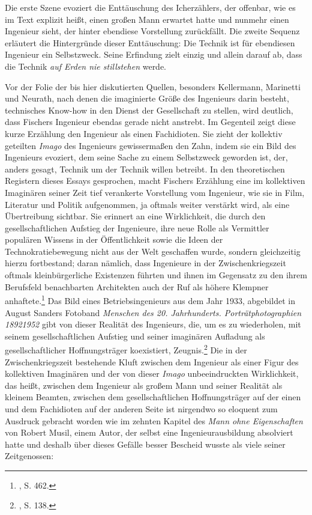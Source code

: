 \documentclass[%
	fontsize=10pt,%
	twoside,%
	headings=optiontoheadandtoc,%
	showtrims]{scrbook}
\renewenvironment{quote}{%
  \addmargin[\genericindent]{0pt}%
  \KOMAoptions{parskip=true}%
  \ifdim\parskip>0pt\else\addvspace{\intextsep}\fi
}{%
  \par
  \endaddmargin\vspace{\intextsep}
}
\begin{document}
\par Die erste Szene evoziert die Enttäuschung des Icherzählers, der offenbar, wie es im Text explizit heißt, einen großen Mann erwartet hatte und nunmehr einen Ingenieur sieht, der hinter ebendiese Vorstellung zurückfällt. Die zweite Sequenz erläutert die Hintergründe dieser Enttäuschung: Die Technik ist für ebendiesen Ingenieur ein Selbstzweck. Seine Erfindung zielt einzig und allein darauf ab, dass die Technik \emph{auf Erden nie stillstehen} werde.\par Vor der Folie der bis hier diskutierten Quellen, besonders Kellermann, Marinetti und Neurath, nach denen die imaginierte Größe des Ingenieurs darin besteht, technisches Know-how in den Dienst der Gesellschaft zu stellen, wird deutlich, dass Fischers Ingenieur ebendas gerade nicht anstrebt. Im Gegenteil zeigt diese kurze Erzählung den Ingenieur als einen Fachidioten. Sie zieht der kollektiv geteilten \emph{Imago} des Ingenieurs gewissermaßen den Zahn, indem sie ein Bild des Ingenieurs evoziert, dem seine Sache zu einem Selbstzweck geworden ist, der, anders gesagt, Technik um der Technik willen betreibt. In den theoretischen Registern dieses Essays gesprochen, macht Fischers Erzählung eine im kollektiven Imaginären seiner Zeit tief verankerte Vorstellung vom Ingenieur, wie sie in Film, Literatur und Politik aufgenommen, ja oftmals weiter verstärkt wird, als eine Übertreibung sichtbar. Sie erinnert an eine Wirklichkeit, die durch den gesellschaftlichen Aufstieg der Ingenieure, ihre neue Rolle als Vermittler populären Wissens in der Öffentlichkeit sowie die Ideen der Technokratiebewegung nicht aus der Welt geschaffen wurde, sondern gleichzeitig hierzu fortbestand; daran nämlich, dass Ingenieure in der Zwischenkriegszeit oftmals kleinbürgerliche Existenzen führten und ihnen im Gegensatz zu den ihrem Berufsfeld benachbarten Architekten auch der Ruf als höhere Klempner anhaftete.\footnote{\cite[][]{treue1967a}, S. 462.}  Das Bild eines Betriebsingenieurs aus dem Jahr 1933, abgebildet in August Sanders Fotoband \emph{Menschen des 20. Jahrhunderts. Porträtphotographien 1892}\textendash{}\emph{1952} gibt von dieser Realität des Ingenieurs, die, um es zu wiederholen, mit seinem gesellschaftlichen Aufstieg und seiner imaginären Aufladung als gesellschaftlicher Hoffnungsträger koexistiert, Zeugnis.\footnote{\cite[][]{sander1980a}, S. 138.}  Die in der Zwischenkriegszeit bestehende Kluft zwischen dem Ingenieur als einer Figur des kollektiven Imaginären und der von dieser \emph{Imago} unbeeindruckten Wirklichkeit, das heißt, zwischen dem Ingenieur als großem Mann und seiner Realität als kleinem Beamten, zwischen dem gesellschaftlichen Hoffnungsträger auf der einen und dem Fachidioten auf der anderen Seite ist nirgendwo so eloquent zum Ausdruck gebracht worden wie im zehnten Kapitel des \emph{Mann ohne Eigenschaften} von Robert Musil, einem Autor, der selbst eine Ingenieurausbildung absolviert hatte und deshalb über dieses Gefälle besser Bescheid wusste als viele seiner Zeitgenossen:\begin{quote}

\end{quote}
\end{document}
